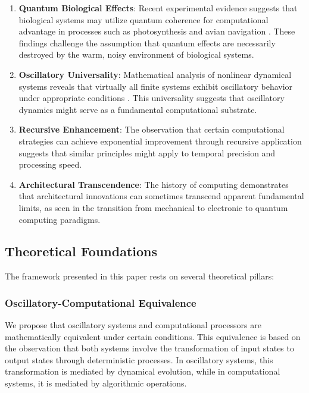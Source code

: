 \documentclass[12pt,a4paper]{article}
\theoremstyle{definition}
\begin{document}
\begin{enumerate}
\item \textbf{Quantum Biological Effects}: Recent experimental evidence suggests that biological systems may utilize quantum coherence for computational advantage in processes such as photosynthesis and avian navigation \cite{scholes2011lessons, ritz2000resonance}. These findings challenge the assumption that quantum effects are necessarily destroyed by the warm, noisy environment of biological systems.

\item \textbf{Oscillatory Universality}: Mathematical analysis of nonlinear dynamical systems reveals that virtually all finite systems exhibit oscillatory behavior under appropriate conditions \cite{strogatz1994nonlinear}. This universality suggests that oscillatory dynamics might serve as a fundamental computational substrate.

\item \textbf{Recursive Enhancement}: The observation that certain computational strategies can achieve exponential improvement through recursive application suggests that similar principles might apply to temporal precision and processing speed.

\item \textbf{Architectural Transcendence}: The history of computing demonstrates that architectural innovations can sometimes transcend apparent fundamental limits, as seen in the transition from mechanical to electronic to quantum computing paradigms.
\end{enumerate}

\subsection{Theoretical Foundations}

The framework presented in this paper rests on several theoretical pillars:

\subsubsection{Oscillatory-Computational Equivalence}

We propose that oscillatory systems and computational processors are mathematically equivalent under certain conditions. This equivalence is based on the observation that both systems involve the transformation of input states to output states through deterministic processes. In oscillatory systems, this transformation is mediated by dynamical evolution, while in computational systems, it is mediated by algorithmic operations.
\end{document}
